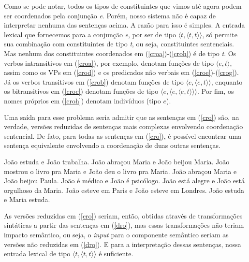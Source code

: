 \n Como se pode notar, todos os tipos de constituintes que vimos
até agora podem ser coordenados pela conjun\-ção \textit{e}. Porém,
nosso sistema não é capaz de interpretar nenhuma das senten\-ças
acima. A razão para isso é simples. A entrada lexical que
fornecemos para a conjun\-ção \textit{e}, por ser de tipo $\langle
t,\langle t,t\rangle\rangle$, só permite sua combina\-ção com
constituintes de tipo \textit{t}, ou seja, constituintes
sentenciais. Mas nenhum dos constituintes coordenados em
(\ref{croa})-(\ref{croh}) é de tipo \textit{t}. Os verbos
intransitivos em (\ref{croa}), por exemplo, denotam fun\-çõ\-es de
tipo $\langle e,t\rangle$, assim como os VPs em (\ref{crod}) e os
predicados não verbais em (\ref{croe})-(\ref{crog}). Já os verbos
transitivos em (\ref{crob}) denotam fun\-çõ\-es de tipo $\langle
e,\langle e,t\rangle\rangle$, enquanto os bitransitivos em
(\ref{croc}) denotam fun\-çõ\-es de tipo $\langle e,\langle e,
\langle e,t\rangle\rangle\rangle$. Por fim, os nomes próprios em
(\ref{croh}) denotam indivíduos (tipo $e$).

Uma saída para esse problema seria admitir que as senten\-ças em
(\ref{cro}) são, na verdade, versões reduzidas de senten\-ças mais
complexas envolvendo coordena\-ção sentencial. De fato, para todas
as senten\-ças em (\ref{cro}), é possível encontrar uma senten\-ça
equivalente envolvendo a coordena\-ção de duas outras senten\-ças.

\begin{exe}
\ex\label{dro}
\begin{xlist}
\ex João estuda e João trabalha.\label{droa}
\ex João abraçou Maria e João beijou Maria.\label{drob}
\ex João mostrou o livro pra Maria e João deu o livro pra Maria.\label{droc}
\ex João abraçou Maria e João beijou Paula.\label{drod}
\ex João é médico e João é psicólogo.\label{droe}
\ex João está alegre e João está orgulhoso da Maria.\label{drof}
\ex João esteve em Paris e João esteve em Londres.\label{drog}
\ex João estuda e Maria estuda.\label{droh}

\end{xlist}
\end{exe}

\n As versões reduzidas em (\ref{cro}) seriam, então, obtidas
através de transforma\-çõ\-es sintáticas a partir das senten\-ças
em (\ref{dro}), mas essas transforma\-çõ\-es não teriam impacto
semântico, ou seja, o \textit{input} para o componente semântico
seriam as versões não reduzidas em (\ref{dro}). E para a
interpreta\-ção dessas senten\-ças, nossa entrada lexical de tipo
$\langle t,\langle t,t\rangle\rangle$ é suficiente.

